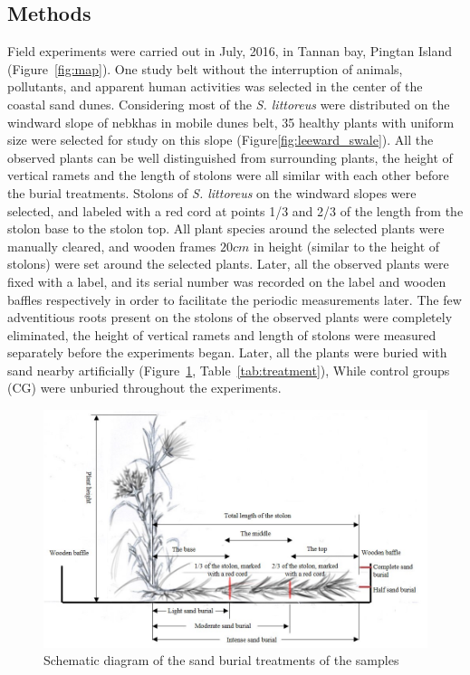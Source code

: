 \documentclass[]{interact}
\theoremstyle{plain}%
\theoremstyle{definition}
\theoremstyle{remark}
\begin{document}
\subsection{Methods}
Field experiments were carried out in July, 2016, in Tannan bay, Pingtan Island (Figure~\ref{fig:map}). One study belt without the interruption of animals, pollutants, and apparent human activities was selected in the center of the coastal sand dunes. 
Considering most of the \textit{S. littoreus} were distributed on the windward slope of nebkhas in mobile dunes belt, 35 healthy plants with uniform size were selected for study on this slope (Figure\ref{fig:leeward_swale}). All the observed plants can be well distinguished from surrounding plants, the height of vertical ramets and the length of stolons were all similar with each other before the burial treatments. Stolons of \textit{S. littoreus} on the windward slopes were selected, and labeled with a red cord at points 1/3 and 2/3 of the length from the stolon base to the stolon top. All plant species around the selected plants were manually cleared, and wooden frames $20 cm$ in height (similar to the height of stolons) were set around the selected plants. Later, all the observed plants were fixed with a label, and its serial number was recorded on the label and wooden baffles respectively in order to facilitate the periodic measurements later. The few adventitious roots present on the stolons of the observed plants were completely eliminated, the height of vertical ramets and length of stolons were measured separately before the experiments began. Later, all the plants were buried with sand nearby artificially (Figure~\ref{fig:diagram}, Table~\ref{tab:treatment}), While control groups (CG) were unburied throughout the experiments. 


\begin{figure}
  \centering
  \includegraphics[scale=0.5]{../figs/diagram.jpg}
  \caption{Schematic diagram of the sand burial treatments of the samples} 
  \label{fig:diagram}
\end{figure}
\end{document}
